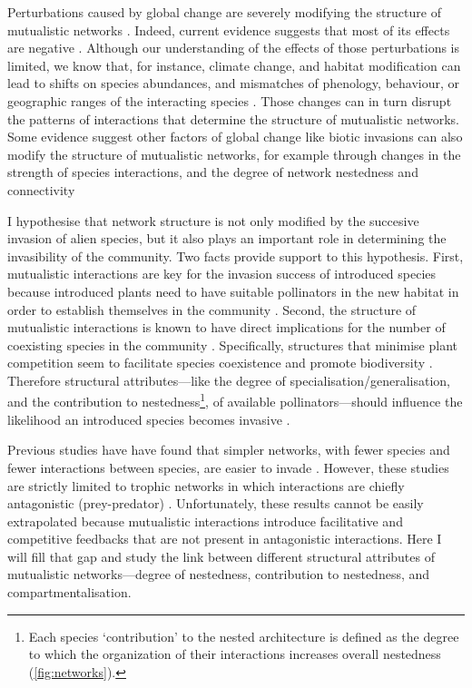 \documentclass[a4paper]{article}
\begin{document}
Perturbations caused by global change are severely modifying the structure of mutualistic networks \autocite{Burkle2013a}.
Indeed, current evidence suggests that most of its effects are negative \autocite{Tylianakis2008, Tylianakis2010}.
Although our understanding of the effects of those perturbations is limited, we know that, for instance, climate change, and habitat modification can lead to shifts on species abundances, and mismatches of phenology, behaviour, or geographic ranges of the interacting species \autocite{Memmott2007, Tylianakis2008, Hegland2009, Burkle2013a}.
Those changes can in turn disrupt the patterns of interactions that determine the structure of mutualistic networks.
Some evidence suggest other factors of global change like biotic invasions can also modify the structure of mutualistic networks, for example through changes in the strength of species interactions, and the degree of network nestedness and connectivity \autocite{Olesen2002, Aizen2008, Bartomeus2008, Vila2009, Traveset2013}

I hypothesise that network structure is not only modified by the succesive invasion of alien species, but it also plays an important role in determining the invasibility of the community.
Two facts provide support to this hypothesis.
First, mutualistic interactions are key for the invasion success of introduced species because introduced plants need to have suitable pollinators in the new habitat in order to establish themselves in the community \autocite{Richardson2000, Sargent2008}.
Second, the structure of mutualistic interactions is known to have direct implications for the number of coexisting species in the community \autocite{Moeller2004, Bascompte2006, Bascompte2007, Bastolla2009}.
Specifically, structures that minimise plant competition seem to facilitate species coexistence and promote biodiversity \autocite{Bastolla2009}.
Therefore structural attributes---like the degree of specialisation/generalisation, and the contribution to nestedness\footnote{Each species ‘contribution’ to the nested architecture is defined as the degree to which the organization of their interactions increases overall nestedness\autocite{Saavedra2011} (\autoref{fig:networks}).}, of available pollinators---should influence the likelihood an introduced species becomes invasive \autocite{Stouffer2014}.

Previous studies have have found that simpler networks, with fewer species and fewer interactions between species, are easier to invade \autocite{Romanuk2009, Galiana2014}.
However, these studies are strictly limited to trophic networks in which interactions are chiefly antagonistic (prey-predator) \autocite{Romanuk2009, Baiser2010, Galiana2014}.
Unfortunately, these results cannot be easily extrapolated because mutualistic interactions introduce facilitative and competitive feedbacks that are not present in antagonistic interactions.
Here I will fill that gap and study the link between different structural attributes of mutualistic networks---degree of nestedness, contribution to nestedness, and compartmentalisation.
\end{document}
